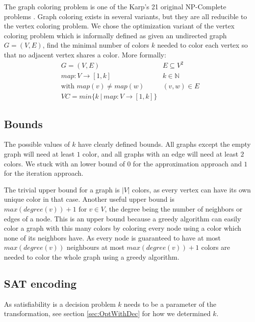 \documentclass{sig-alternate}
\begin{document}
The graph coloring problem is one of the Karp's 21 original NP-Complete problems \cite{karp1972reducibility}.
Graph coloring exists in several variants, but they are all reducible to the vertex coloring problem.
We chose the optimization variant of the vertex coloring problem which is informally defined as given an undirected graph $G = (V,E)$, find the minimal number of colors $k$ needed to color each vertex so that no adjacent vertex shares a color.
More formally:
\begin{subequations}
\begin{align*}
        & G = (V,E) & E \subseteq V^2\\
        & map : V \rightarrow [1,k] & k \in \mathbb{N} \\
        & \text{with } map(v) \neq map(w) & (v,w) \in E \\
        & VC = min\{k \ | \  map : V \rightarrow [1,k]\}
\end{align*}
\end{subequations}

\subsection{Bounds}

The possible values of $k$ have clearly defined bounds.
All graphs except the empty graph will need at least $1$ color, and all graphs with an edge will need at least $2$ colors.
We stuck with an lower bound of $0$ for the approximation approach and $1$ for the iteration approach.

The trivial upper bound for a graph is $|V|$ colors, as every vertex can have its own unique color in that case.
Another useful upper bound is $max(degree(v))+1 \text{ for } v \in V$, the degree being the number of neighbors or edges of a node.
This is an upper bound because a greedy algorithm can easily color a graph with this many colors by coloring every node using a color which none of its neighbors have.
As every node is guaranteed to have at most $max(degree(v))$ neighbours at most $max(degree(v))+1$ colors are needed to color the whole graph using a greedy algorithm.

\subsection{SAT encoding}

As satisfiability is a decision problem $k$ needs to be a parameter of the transformation, see section \ref{sec:OptWithDec} for how we determined $k$.
\end{document}
